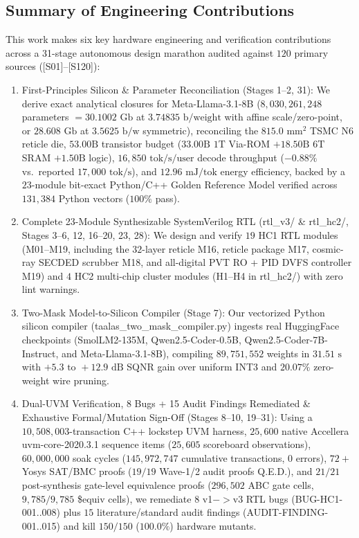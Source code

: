 \documentclass[10pt,journal,compsoc]{IEEEtran}
\def\texttt#1{#1}%
\def\textbf#1{#1}%
\def\to{->}%
\begin{document}
\subsection{Summary of Engineering Contributions}
This work makes six key hardware engineering and verification contributions across a 31-stage autonomous design marathon audited against $120$ primary sources (\texttt{[S01]}--\texttt{[S120]}):
\begin{enumerate}
    \item \textbf{First-Principles Silicon \& Parameter Reconciliation (Stages 1--2, 31)}: We derive exact analytical closures for \texttt{Meta-Llama-3.1-8B} ($8,030,261,248$ parameters $= 30.1002\text{ Gb}$ at $3.74835\text{ b/weight}$ with affine scale/zero-point, or $28.608\text{ Gb}$ at $3.5625\text{ b/w}$ symmetric), reconciling the $815.0\text{ mm}^2$ TSMC N6 reticle die, $53.00\text{B}$ transistor budget ($33.00\text{B}$ $1\text{T}$ Via-ROM $+ 18.50\text{B}$ $6\text{T}$ SRAM $+ 1.50\text{B}$ logic), $16,850\text{ tok/s/user}$ decode throughput ($-0.88\%$ vs.\ reported $17,000\text{ tok/s}$), and $12.96\text{ mJ/tok}$ energy efficiency, backed by a $23$-module bit-exact Python/C++ Golden Reference Model verified across $131,384$ Python vectors ($100\%$ pass).
    \item \textbf{Complete 23-Module Synthesizable SystemVerilog RTL (\texttt{rtl\_v3/} \& \texttt{rtl\_hc2/}, Stages 3--6, 12, 16--20, 23, 28)}: We design and verify $19$ HC1 RTL modules (\texttt{M01}--\texttt{M19}, including the $32$-layer reticle \texttt{M16}, reticle package \texttt{M17}, cosmic-ray SECDED scrubber \texttt{M18}, and all-digital PVT RO + PID DVFS controller \texttt{M19}) and $4$ HC2 multi-chip cluster modules (\texttt{H1}--\texttt{H4} in \texttt{rtl\_hc2/}) with zero lint warnings.
    \item \textbf{Two-Mask Model-to-Silicon Compiler (Stage 7)}: Our vectorized Python silicon compiler (\texttt{taalas\_two\_mask\_compiler.py}) ingests real HuggingFace checkpoints (\texttt{SmolLM2-135M}, \texttt{Qwen2.5-Coder-0.5B}, \texttt{Qwen2.5-Coder-7B-Instruct}, and \texttt{Meta-Llama-3.1-8B}), compiling $89,751,552$ weights in $31.51\text{ s}$ with $+5.3\text{ to }+12.9\text{ dB}$ SQNR gain over uniform \texttt{INT3} and $20.07\%$ zero-weight wire pruning.
    \item \textbf{Dual-UVM Verification, 8 Bugs + 15 Audit Findings Remediated \& Exhaustive Formal/Mutation Sign-Off (Stages 8--10, 19--31)}: Using a $10,508,003$-transaction C++ lockstep UVM harness, $25,600$ native Accellera \texttt{uvm-core-2020.3.1} sequence items ($25,605$ scoreboard observations), $60,000,000$ soak cycles ($145,972,747$ cumulative transactions, $0$ errors), $72+$ Yosys SAT/BMC proofs ($19/19$ Wave-1/2 audit proofs \texttt{Q.E.D.}), and $21/21$ post-synthesis gate-level equivalence proofs ($296,502$ ABC gate cells, $9,785/9,785$ \texttt{\$equiv} cells), we remediate $8$ v1$\to$v3 RTL bugs (\texttt{BUG-HC1-001}..\texttt{008}) plus $15$ literature/standard audit findings (\texttt{AUDIT-FINDING-001}..\texttt{015}) and kill $150/150$ ($100.0\%$) hardware mutants.

\end{enumerate}
\end{document}
